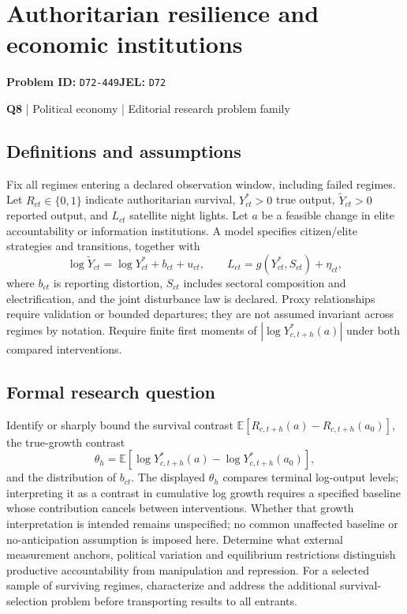 \documentclass[11pt,a4paper]{article}
\begin{document}
\section*{Authoritarian resilience and economic institutions}
\textbf{Problem ID:} \texttt{D72-449}\quad \textbf{JEL:} \texttt{D72}\par
\label{problem:OP-0128}
\label{atlas:prob:Q8}
{\sffamily\small\color{muted}\textbf{Q8} | Political economy | Editorial research problem family\par}
\subsection*{Definitions and assumptions}
Fix all regimes entering a declared observation window, including failed regimes. Let $R_{ct}\in\{0,1\}$ indicate authoritarian survival, $Y^*_{ct}>0$ true output, $\widetilde Y_{ct}>0$ reported output, and $L_{ct}$ satellite night lights. Let $a$ be a feasible change in elite accountability or information institutions. A model specifies citizen/elite strategies and transitions, together with
\[
\log\widetilde Y_{ct}=\log Y^*_{ct}+b_{ct}+u_{ct},\qquad
L_{ct}=g(Y^*_{ct},S_{ct})+\eta_{ct},
\]
where $b_{ct}$ is reporting distortion, $S_{ct}$ includes sectoral composition and electrification, and the joint disturbance law is declared. Proxy relationships require validation or bounded departures; they are not assumed invariant across regimes by notation. Require finite first moments of $|\log Y^*_{c,t+h}(a)|$ under both compared interventions.
\subsection*{Formal research question}
Identify or sharply bound the survival contrast $\mathbb E[R_{c,t+h}(a)-R_{c,t+h}(a_0)]$, the true-growth contrast
\[
\theta_h=\mathbb E[\log Y^*_{c,t+h}(a)-\log Y^*_{c,t+h}(a_0)],
\]
and the distribution of $b_{ct}$. The displayed $\theta_h$ compares terminal log-output levels; interpreting it as a contrast in cumulative log growth requires a specified baseline whose contribution cancels between interventions. Whether that growth interpretation is intended remains unspecified; no common unaffected baseline or no-anticipation assumption is imposed here. Determine what external measurement anchors, political variation and equilibrium restrictions distinguish productive accountability from manipulation and repression. For a selected sample of surviving regimes, characterize and address the additional survival-selection problem before transporting results to all entrants.
\end{document}
